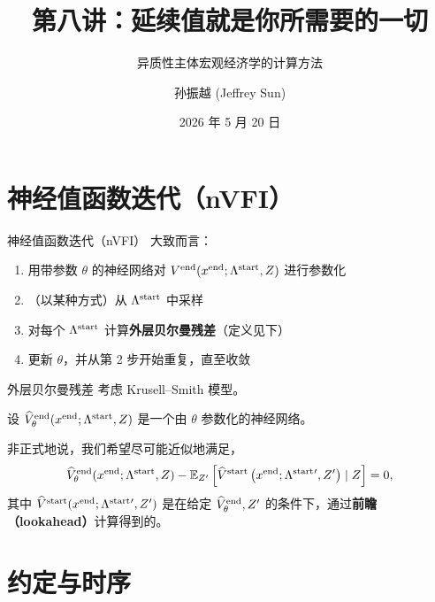 \documentclass[10pt,aspectratio=169]{beamer}
\title{第八讲：延续值就是你所需要的一切}
\subtitle{异质性主体宏观经济学的计算方法}
\author{孙振越 (Jeffrey Sun)}
\institute{多伦多大学}
\date{2026 年 5 月 20 日}
\begin{document}
\maketitle

\section[nVFI]{神经值函数迭代（nVFI）}

\begin{frame}{神经值函数迭代（nVFI）}
  大致而言：
  \begin{enumerate}
    \item 用带参数 $\theta$ 的神经网络对 $V^{\mathrm{end}}(x^{\mathrm{end}}; \Lambda^{\mathrm{start}}, Z)$ 进行参数化
    \item （以某种方式）从 $\Lambda^{\mathrm{start}}$ 中采样
    \item 对每个 $\Lambda^{\mathrm{start}}$ 计算\textbf{外层贝尔曼残差}（定义见下）
    \item 更新 $\theta$，并从第 2 步开始重复，直至收敛
  \end{enumerate}
\end{frame}

\begin{frame}{外层贝尔曼残差}
  考虑 Krusell--Smith 模型。

  设 $\widehat{V}^{\mathrm{end}}_\theta(x^{\mathrm{end}}; \Lambda^{\mathrm{start}}, Z)$ 是一个由 $\theta$ 参数化的神经网络。

  非正式地说，我们希望尽可能近似地满足，
  \[
    \widehat{V}^{\mathrm{end}}_\theta(x^{\mathrm{end}}; \Lambda^{\mathrm{start}}, Z) - \mathbb{E}_{Z'}\left[ \widehat{V}^{\mathrm{start}}\left( x^{\mathrm{end}}; \Lambda^{\mathrm{start}}{}', Z' \right)\mid Z \right] = 0,
  \]
  其中 $\widehat{V}^{\mathrm{start}}(x^{\mathrm{end}};\Lambda^{\mathrm{start}}{}',Z')$ 是在给定 $\widehat{V}^{\mathrm{end}}_\theta, Z'$ 的条件下，通过\textbf{前瞻（lookahead）}计算得到的。
\end{frame}

\section[约定]{约定与时序}
\end{document}
